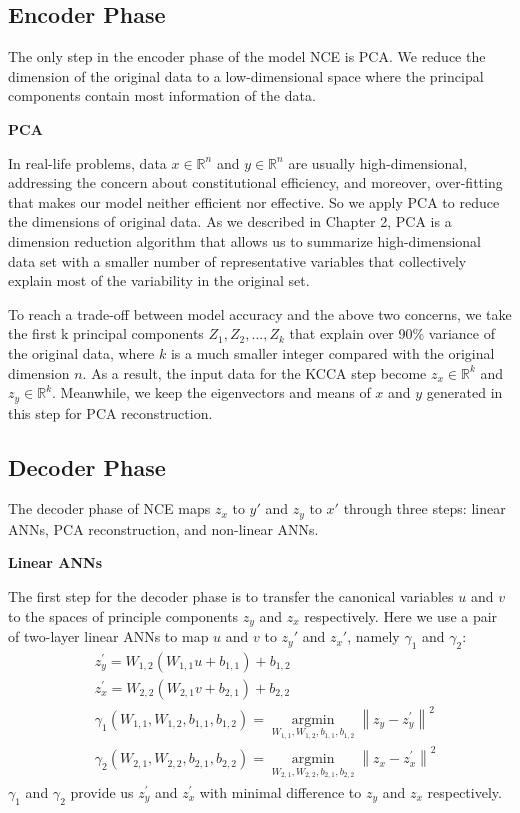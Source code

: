 \documentclass[12pt]{report} %
\newcommand{\norm}[1]{\left\lVert #1 \right\rVert}
\begin{document}
\subsection{Encoder Phase}
The only step in the encoder phase of the model NCE is PCA. We reduce the dimension of the original data to a low-dimensional space where the principal components contain most information of the data. 

\textbf{PCA}

In real-life problems, data $x\in \mathbb{R}^{n}$ and $y\in \mathbb{R}^{n}$ are usually high-dimensional, addressing the concern about constitutional efficiency, and moreover, over-fitting\cite{STAT} that makes our model neither efficient nor effective. So we apply PCA to reduce the dimensions of original data. As we described in Chapter 2, PCA is a dimension reduction algorithm that allows us to summarize high-dimensional data set with a smaller number of representative variables that collectively explain most of the variability in the original set.

To reach a trade-off between model accuracy and the above two concerns, we take the first k principal components \(Z_{1}, Z_{2},..., Z_{k}\) that explain over 90\% variance of the original data, where $k$ is a much smaller integer compared with the original dimension $n$. As a result, the input data for the KCCA step become $z_x\in \mathbb{R}^{k}$ and $z_y\in \mathbb{R}^{k}$. Meanwhile, we keep the eigenvectors and means of $x$ and $y$ generated in this step for PCA reconstruction.

\subsection{Decoder Phase}
The decoder phase of NCE maps $z_x$ to $y'$ and $z_y$ to $x'$ through three steps: linear ANNs, PCA reconstruction, and non-linear ANNs.

\textbf{Linear ANNs}

The first step for the decoder phase is to transfer the canonical variables $u$ and $v$ to the spaces of principle components $z_y$ and $z_x$ respectively. Here we use a pair of two-layer linear ANNs to map $u$ and $v$ to $z_y{'}$ and $z_x{'}$, namely $\gamma_1$ and $\gamma_2$:
\begin{equation}
\begin{split}
&z_y^{'}=W_{1,2}(W_{1,1}u+b_{1,1})+b_{1,2} \\
&z_x^{'}=W_{2,2}(W_{2,1}v+b_{2,1})+b_{2,2} \\
&\gamma_1(W_{1,1},W_{1,2},b_{1,1},b_{1,2})=\operatorname*{argmin}_{W_{1,1},W_{1,2},b_{1,1},b_{1,2}}\norm{z_y-z_y^{'}}^2 \\
&\gamma_2(W_{2,1},W_{2,2},b_{2,1},b_{2,2})=\operatorname*{argmin}_{W_{2,1},W_{2,2},b_{2,1},b_{2,2}}\norm{z_x-z_x^{'}}^2
\end{split}
\end{equation}
$\gamma_1$ and $\gamma_2$ provide us $z_y^{'}$ and $z_x^{'}$ with minimal difference to $z_y$ and $z_x$ respectively.
\end{document}

